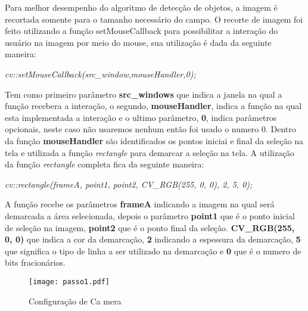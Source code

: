 Para melhor desempenho do algoritmo de detecção de objetos, a imagem é recortada somente para o tamanho necessário do campo. O recorte de imagem foi feito utilizando a função setMouseCallback para possibilitar a interação do usuário na imagem por meio do mouse, sua utilização é dada da seguinte maneira:
\begin{center}
\centering \textit{ cv::setMouseCallback(src\_window,mouseHandler,0);}
\end{center}
Tem como primeiro parâmetro \textbf{src\_windows} que indica a janela na qual a função recebera a interação,  o segundo, \textbf{mouseHandler}, indica a função na qual esta implementada a interação e o ultimo parâmetro, \textbf{0}, indica parâmetros opcionais, neste caso não usaremos nenhum então foi usado o numero 0.
Dentro da função \textbf{mouseHandler} são identificados os pontos iniciai e final da seleção na tela e utilizada a função \textit{rectangle} para demarcar a seleção na tela. A utilização da função \textit{rectangle} completa fica da seguinte maneira:
\begin{center}
\centering \textit{ cv::rectangle(frameA, point1, point2, CV\_RGB(255, 0, 0), 2, 5, 0);}
\end{center}
A função recebe os parâmetros \textbf{frameA} indicando a imagem na qual será demarcada a área selecionada, depois o parâmetro \textbf{point1} que é o ponto inicial de seleção na imagem, \textbf{point2} que é o ponto final da seleção. \textbf{CV\_RGB(255, 0, 0)} que indica a cor da demarcação, \textbf{2} indicando a espessura da demarcação, \textbf{5} que significa o tipo de linha a ser utilizado na demarcação e \textbf{0} que é o numero de bits fracionários.

\begin{figure}[H]
			\centering
			\texttt{[image: passo1.pdf]}
			\caption{ Configuração de Ca mera}
			\label{Configuracao}
		\end{figure}		


